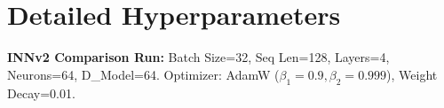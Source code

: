 \documentclass[a4paper,11pt]{article}
\begin{document}
\appendix
\section{Detailed Hyperparameters}
\textbf{INNv2 Comparison Run:} Batch Size=32, Seq Len=128, Layers=4, Neurons=64, D\_Model=64. Optimizer: AdamW ($\beta_1=0.9, \beta_2=0.999$), Weight Decay=0.01.
\end{document}
